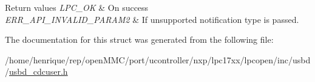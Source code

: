 \begin{DoxyRetVals}{Return values}
{\em L\-P\-C\-\_\-\-O\-K} & On success \\
\hline
{\em E\-R\-R\-\_\-\-A\-P\-I\-\_\-\-I\-N\-V\-A\-L\-I\-D\-\_\-\-P\-A\-R\-A\-M2} & If unsupported notification type is passed. \\
\hline
\end{DoxyRetVals}


The documentation for this struct was generated from the following file\-:\begin{DoxyCompactItemize}
\item 
/home/henrique/rep/open\-M\-M\-C/port/ucontroller/nxp/lpc17xx/lpcopen/inc/usbd/\hyperlink{usbd__cdcuser_8h}{usbd\-\_\-cdcuser.\-h}\end{DoxyCompactItemize}
